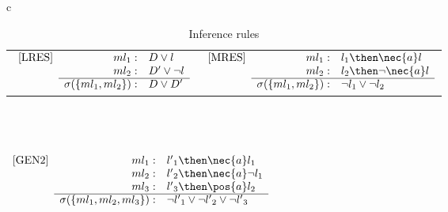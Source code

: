 \begin{table}
    \caption{Inference rules}
\centering
{\scriptsize
\begin{tabular}{c}
\\
\begin{tabular}{cc}
$
\begin{array}{lrl}
\mbox{[LRES]} &ml_1: & D \lor l\\
 &ml_2: & D' \lor \neg l\\  \cline{2-3}
    &\sigma(\{ml_1,ml_2\}): & D \lor D'
\end{array}
$
    &
$
\begin{array}{lrl}
\mbox{[MRES]} &ml_1: & l_1   \then  \nec{a} l \\
              &ml_2: & l_2  \then  \neg \nec{a} l\\ \cline{2-3}
              &\sigma(\{ml_1,ml_2\}): & \neg l_1 \lor \neg l_2
\end{array}
$
\end{tabular}
\\
\\
\\
$
\begin{array}{lrl}
    \mbox{[GEN2]}& ml_1: & {l'}_1 \then \nec{a} l_1 \\
                 & ml_2: & {l'}_2 \then \nec{a} \neg l_1 \\
                 & ml_3: & {l'}_3 \then \pos{a} l_2 \\ \cline{2-3}
                 & \sigma(\{ml_1, ml_2, ml_3\}): &  \neg  {l'}_1 \lor  \neg {l'}_2 \lor \neg {l'}_3
\end{array} 
$
\\
\\
\\
{\setlength{\arraycolsep}{1pt}
}
\end{tabular}}
\end{table}
